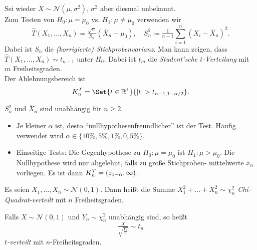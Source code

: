 \documentclass{cheat-sheet}
\newcommand{\Normal}{\mathcal{N}} %
\begin{document}
\begin{bsp}
  Sei wieder $X \sim \Normal(\mu, \sigma^2)$, $\sigma^2$ aber diesmal unbekannt. \\
  Zum Testen von $H_0 : \mu = \mu_0$ vs. $H_1 : \mu \neq \mu_0$ verwenden wir
  \[
    \hat{T}(X_1, \ldots, X_n) = \tfrac{\sqrt{n}}{S_n} \left( \overline{X}_n - \mu_0 \right), \quad
    S_n^2 \coloneqq \tfrac{1}{n-1} \sum_{i=1}^n \left( X_i - \overline{X}_n \right)^2.
  \]
  Dabei ist $S_n$ die \emph{(korrigierte) Stichprobenvarianz}.
  Man kann zeigen, dass $\hat{T}(X_1, \ldots, X_n) \sim t_{n-1}$ unter $H_0$.
  Dabei ist $t_m$ die \emph{Student'sche $t$-Verteilung} mit $m$ Freiheitsgraden. \\
  Der Ablehnungsbereich ist
  \[ K_n^T = \Set{t \in \R^1}{\abs{t} > t_{n-1,1-\alpha/2}}. \]
\end{bsp}

\begin{bem}
  $S_n^2$ und $\overline{X}_n$ sind unabhängig für $n \geq 2$. %
\end{bem}

\begin{diskussion}
  \begin{itemize}
    \item Je kleiner $\alpha$ ist, desto "`nullhypothesenfreundlicher"' ist der Test.
    Häufig verwendet wird $\alpha \in \{ 10\%, 5\%, 1\%, 0,5\% \}$.
    \item Einseitige Tests: Die Gegenhypothese zu $H_0 \!:\! \mu \!=\! \mu_0$ ist $H_1 \!:\! \mu \!>\! \mu_0$.
    Die Nullhypothese wird nur abgelehnt, falls zu große Stichproben- mittelwerte $\overline{x}_n$ vorliegen. Es ist dann $K_n^T = \left( z_{1-\alpha}, \infty \right)$.
  \end{itemize}
\end{diskussion}


\begin{defn}
  Es seien $X_1, \ldots, X_n \sim \Normal(0, 1)$.
  Dann heißt die Summe $X_1^2 + \ldots + X_n^2 \sim \chi_n^2$ \emph{Chi-Quadrat-verteilt} mit $n$ Freiheitsgraden.
\end{defn}

\begin{defn}
  Falls $X \sim \Normal(0,1)$ und $Y_n \sim \chi_n^2$ unabhängig sind, so heißt
  \[ \tfrac{X}{\sqrt{\tfrac{Y_n}{n}}} \sim t_n \]
  \emph{$t$-verteilt} mit $n$-Freiheitsgraden.
\end{defn}
\end{document}
